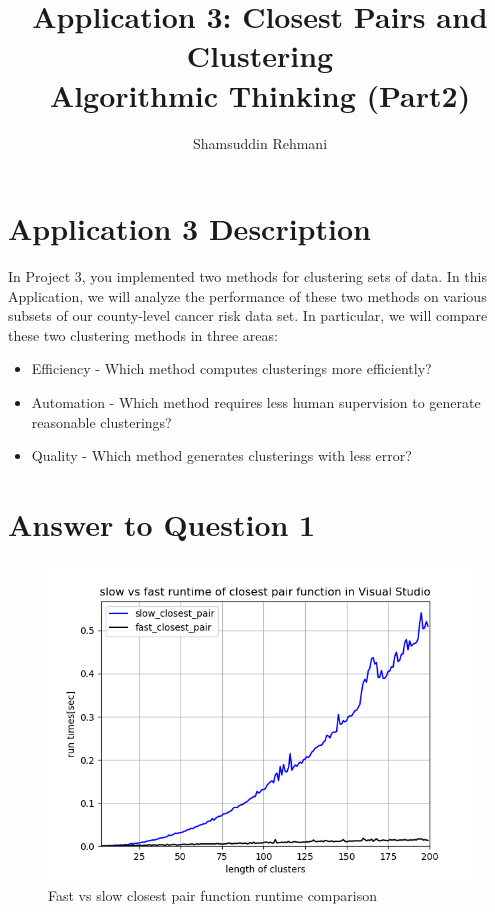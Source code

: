 \documentclass[a4paper]{article}
\title{Application 3: Closest Pairs and Clustering \\Algorithmic Thinking (Part2)}
\author{Shamsuddin Rehmani}
\begin{document}
\sloppy
\maketitle
\section*{Application 3 Description}
In Project 3, you implemented two methods for clustering sets of data. In this Application, we will analyze the performance of these two methods on various subsets of our county-level cancer risk data set. In particular, we will compare these two clustering methods in three areas:

\begin{itemize}
	\item Efficiency - Which method computes clusterings more efficiently?
	\item Automation - Which method requires less human supervision to generate reasonable clusterings?
	\item Quality - Which method generates clusterings with less error?
\end{itemize}


\section*{Answer to Question 1}
\FloatBarrier
\begin{figure}[h]
	\centering 
	\includegraphics[scale = 1.0, clip=false, trim=0cm 0cm 0cm 0cm]{Q1_closest_pair_comparision.png}
	\caption{Fast vs slow closest pair function runtime comparison}
\end{figure}
\FloatBarrier
\end{document}
